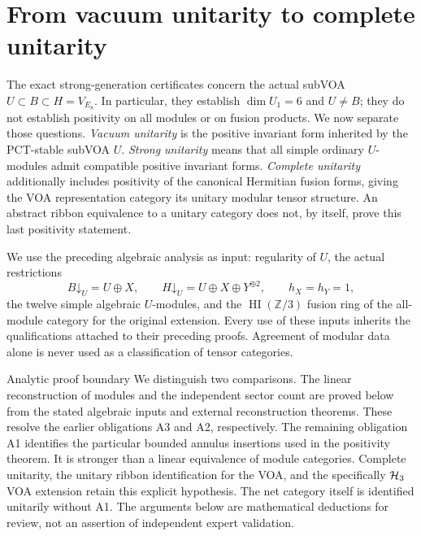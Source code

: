 
\section{From vacuum unitarity to complete unitarity}
\label{sec:analytic-unitarity}

The exact strong-generation certificates concern the actual subVOA
$U\subset B\subset H=V_{E_8}$.  In particular, they establish
$\dim U_1=6$ and $U\ne B$; they do not establish positivity on all
modules or on fusion products.  We now separate those questions.
\emph{Vacuum unitarity} is the positive invariant form inherited by the
PCT-stable subVOA $U$.  \emph{Strong unitarity} means that all simple
ordinary $U$-modules admit compatible positive invariant forms.
\emph{Complete unitarity} additionally includes positivity of the
canonical Hermitian fusion forms, giving the VOA representation category
its unitary modular tensor structure.  An abstract ribbon equivalence to
a unitary category does not, by itself, prove this last positivity statement.

We use the preceding algebraic analysis as input: regularity of $U$,
the actual restrictions
\begin{equation}
 B\mathord\downarrow_U=U\oplus X,
 \qquad
 H\mathord\downarrow_U=U\oplus X\oplus Y^{\oplus2},
 \qquad h_X=h_Y=1,
 \label{eq:analytic-branching}
\end{equation}
the twelve simple algebraic $U$-modules, and the
$\operatorname{HI}(\mathbb Z/3)$ fusion ring of the all-module category
for the original extension.  Every use of these inputs inherits the
qualifications attached to their preceding proofs.  Agreement of modular
data alone is never used as a classification of tensor categories.

\begin{criticalnote}{Analytic proof boundary}
We distinguish two comparisons.  The linear reconstruction of modules
and the independent sector count are proved below from the stated
algebraic inputs and external reconstruction theorems.  These resolve
the earlier obligations A3 and A2, respectively.  The remaining
obligation A1 identifies the particular bounded annulus insertions used
in the positivity theorem.  It is stronger than a linear equivalence
of module categories.  Complete unitarity, the unitary ribbon
identification for the VOA, and the specifically $\mathcal H_3$ VOA extension
retain this explicit hypothesis.  The net category itself is identified
unitarily without A1.  The arguments below are mathematical deductions
for review, not an assertion of independent expert validation.
\end{criticalnote}

